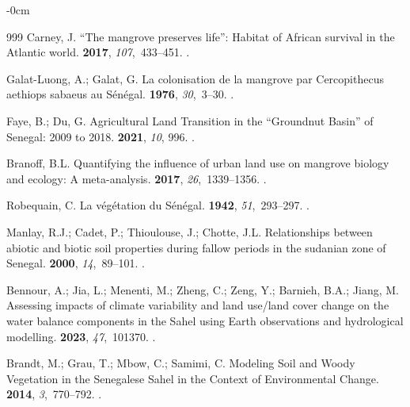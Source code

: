 \documentclass[earth,article,accept,pdftex,moreauthors]{Definitions/mdpi}
\begin{document}
{\begin{adjustwidth}{-\extralength}{0cm}
\begin{thebibliography}{999}
Carney, J.
\newblock “The mangrove preserves life”: Habitat of African survival in the
  Atlantic world.
 {\bf 2017}, {\em 107},~433--451.
.

Galat-Luong, A.; Galat, G.
\newblock La colonisation de la mangrove par Cercopithecus aethiops sabaeus au
  Sénégal.
 {\bf 1976}, {\em
  30},~3--30.
.

Faye, B.; Du, G.
\newblock Agricultural Land Transition in the “Groundnut Basin” of Senegal:
  2009 to 2018.
 {\bf 2021}, {\em 10}, 996.
.

Branoff, B.L.
\newblock Quantifying the influence of urban land use on mangrove biology and
  ecology: A meta-analysis.
 {\bf 2017}, {\em
  26},~1339--1356.
.

Robequain, C.
\newblock La végétation du Sénégal.
 {\bf 1942}, {\em 51},~293--297.
.

Manlay, R.J.; Cadet, P.; Thioulouse, J.; Chotte, J.L.
\newblock Relationships between abiotic and biotic soil properties during
  fallow periods in the sudanian zone of Senegal.
 {\bf 2000}, {\em 14},~89--101.
.

Bennour, A.; Jia, L.; Menenti, M.; Zheng, C.; Zeng, Y.; Barnieh, B.A.; Jiang,
  M.
\newblock Assessing impacts of climate variability and land use/land cover
  change on the water balance components in the Sahel using Earth observations
  and hydrological modelling.
 {\bf 2023}, {\em
  47},~101370.
.

Brandt, M.; Grau, T.; Mbow, C.; Samimi, C.
\newblock Modeling Soil and Woody Vegetation in the Senegalese Sahel in the
  Context of Environmental Change.
 {\bf 2014}, {\em 3},~770--792.
.


\end{thebibliography}
\end{adjustwidth}}
\end{document}
